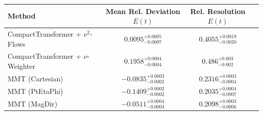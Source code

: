     \begin{tabular}{lccc}
        \toprule
        Method & Mean Rel. Deviation $E(t)$ & Rel. Resolution $E(t)$ \\
        \midrule
        CompactTransformer + $\nu^2$-Flows & $0.0095^{+0.0005}_{-0.0007}$ & $0.4055^{+0.0019}_{-0.0020}$ \\
        CompactTransformer + $\nu$-Weighter & $0.1958^{+0.0004}_{-0.0004}$ & $0.486^{+0.003}_{-0.002}$ \\
        MMT (Cartesian) & $-0.0835^{+0.0003}_{-0.0002}$ & $0.2316^{+0.0003}_{-0.0004}$ \\
        MMT (PtEtaPhi) & $-0.1409^{+0.0002}_{-0.0002}$ & $0.2035^{+0.0004}_{-0.0007}$ \\
        MMT (MagDir) & $-0.0511^{+0.0004}_{-0.0003}$ & $0.2098^{+0.0003}_{-0.0006}$ \\
        \bottomrule
    \end{tabular}
